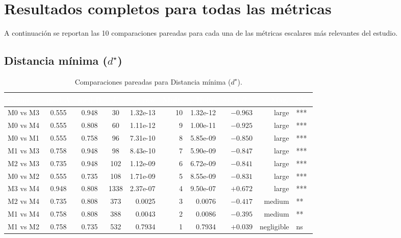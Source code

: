 \documentclass[12pt,a4paper,oneside]{book}
\begin{document}
\section{Resultados completos para todas las métricas}

A continuación se reportan las 10 comparaciones pareadas para cada una de las métricas escalares más relevantes del estudio.

\subsection{Distancia mínima ($d^\star$)}

\begin{table}[H]
\centering
\small
\caption{Comparaciones pareadas para Distancia mínima ($d^\star$).}
\renewcommand{\arraystretch}{1.15}
\begin{tabular}{lcccrrrrrl}
\toprule
\rowcolor{primary}
\textcolor{white}{\textbf{Comp.}} & \textcolor{white}{\textbf{med A}} & \textcolor{white}{\textbf{med B}} & \textcolor{white}{\textbf{$U$}} & \textcolor{white}{\textbf{$p$ raw}} & \textcolor{white}{\textbf{Mult.}} & \textcolor{white}{\textbf{$p$ Holm}} & \textcolor{white}{\textbf{$\delta(A,B)$}} & \textcolor{white}{\textbf{Mag.}} & \textcolor{white}{\textbf{Sig.}} \\
\midrule
M0 vs M3 & 0.555 & 0.948 & 30 & 1.32e-13 & 10 & 1.32e-12 & $-0.963$ & large & *** \\
M0 vs M4 & 0.555 & 0.808 & 60 & 1.11e-12 & 9 & 1.00e-11 & $-0.925$ & large & *** \\
M0 vs M1 & 0.555 & 0.758 & 96 & 7.31e-10 & 8 & 5.85e-09 & $-0.850$ & large & *** \\
M1 vs M3 & 0.758 & 0.948 & 98 & 8.43e-10 & 7 & 5.90e-09 & $-0.847$ & large & *** \\
M2 vs M3 & 0.735 & 0.948 & 102 & 1.12e-09 & 6 & 6.72e-09 & $-0.841$ & large & *** \\
M0 vs M2 & 0.555 & 0.735 & 108 & 1.71e-09 & 5 & 8.55e-09 & $-0.831$ & large & *** \\
M3 vs M4 & 0.948 & 0.808 & 1338 & 2.37e-07 & 4 & 9.50e-07 & $+0.672$ & large & *** \\
M2 vs M4 & 0.735 & 0.808 & 373 & 0.0025 & 3 & 0.0076 & $-0.417$ & medium & ** \\
M1 vs M4 & 0.758 & 0.808 & 388 & 0.0043 & 2 & 0.0086 & $-0.395$ & medium & ** \\
M1 vs M2 & 0.758 & 0.735 & 532 & 0.7934 & 1 & 0.7934 & $+0.039$ & negligible & ns \\
\bottomrule
\end{tabular}
\end{table}
\end{document}
